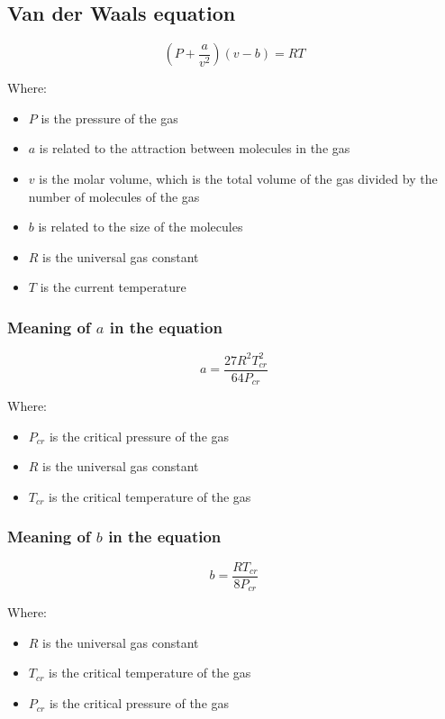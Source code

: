 \documentclass[11pt]{article}
\begin{document}
\newpage
\subsection{Van der Waals equation}
\label{sec:orgc5c7955}
\[\left(P + \frac{a}{v^2} \right) \left(v - b \right) = RT\]

Where:
\begin{itemize}
\item \(P\) is the pressure of the gas
\item \(a\) is related to the attraction between molecules in the gas
\item \(v\) is the molar volume, which is the total volume of the gas divided by the number of molecules of the gas
\item \(b\) is related to the size of the molecules
\item \(R\) is the universal gas constant
\item \(T\) is the current temperature
\end{itemize}
\subsubsection{Meaning of \(a\) in the equation}
\label{sec:orgcb99268}
\[a = \frac{27 R^2 T_{cr}^2}{64 P_{cr}}\]

Where:
\begin{itemize}
\item \(P_{cr}\) is the critical pressure of the gas
\item \(R\) is the universal gas constant
\item \(T_{cr}\) is the critical temperature of the gas
\end{itemize}
\subsubsection{Meaning of \(b\) in the equation}
\label{sec:org3c8fd32}
\[b = \frac{RT_{cr}}{8 P_{cr}}\]

Where:
\begin{itemize}
\item \(R\) is the universal gas constant
\item \(T_{cr}\) is the critical temperature of the gas
\item \(P_{cr}\) is the critical pressure of the gas
\end{itemize}
\end{document}
